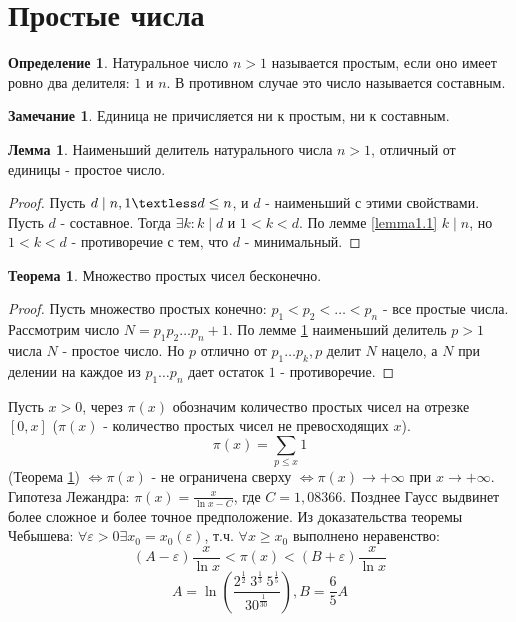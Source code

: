 \documentclass[a4paper, 12pt]{article}
\renewcommand{\epsilon}{\varepsilon}
\newcommand{\lra}{\Leftrightarrow}
\renewcommand{\div}{\mid}
\theoremstyle{definition}
\newtheorem{definition}{Определение}[section]
\newtheorem{theorem}{Теорема}[section]
\newtheorem{lemma}{Лемма}[section]
\newtheorem*{comm}{Замечание}
\begin{document}
    \section{Простые числа}
    \begin{definition}
        Натуральное число $n>1$ называется простым, если оно имеет ровно два делителя: $1$ и $n$. В противном случае это число называется составным.
    \end{definition}
    \begin{comm}
        Единица не причисляется ни к простым, ни к составным.
    \end{comm}
    \begin{lemma} \label{lemma5.1}
        Наименьший делитель натурального числа $n>1$, отличный от единицы - простое число.
    \end{lemma} 
    \begin{proof}
        Пусть $d\div n, 1 \textless d \leq n$, и $d$ - наименьший с этими свойствами. Пусть $d$ - составное. Тогда $\exists k: k\div d$ и $1<k<d$. По лемме \ref{lemma1.1} $k\div n$, но $1<k<d$ - противоречие с тем, что $d$ - минимальный.
    \end{proof} 
    \begin{theorem} \label{th5.1}
        Множество простых чисел бесконечно.
    \end{theorem}
    \begin{proof}
        Пусть множество простых конечно: $p_1<p_2<\dots<p_n$ - все простые числа. Рассмотрим число $N = p_1p_2\dots p_n+1$. По лемме \ref{lemma5.1} наименьший делитель $p>1$ числа $N$ - простое число. Но $p$ отлично от $p_1\dots p_k, p$ делит $N$ нацело, а $N$ при делении на каждое из $p_1\dots p_n$ дает остаток $1$ - противоречие.
    \end{proof} 
    Пусть $x>0$, через $\pi(x)$ обозначим количество простых чисел на отрезке $[0, x]$ ($\pi(x)$ - количество простых чисел не превосходящих $x$).
    $$\pi(x)=\sum\limits_{p\leq x}1$$
    (Теорема \ref{th5.1}) $\lra \pi(x)$ - не ограничена сверху $\lra \pi(x)\to +\infty$ при $x\to +\infty$.\\
    Гипотеза Лежандра: $\pi(x)=\frac{x}{\ln x-C}$, где $C=1,08366$. Позднее Гаусс выдвинет более сложное и более точное предположение.
    Из доказательства теоремы Чебышева: $\forall \epsilon >0\exists x_0=x_0(\epsilon)$, т.ч. $\forall x\geq x_0$ выполнено неравенство:
    $$(A-\epsilon)\frac{x}{\ln x}<\pi(x)<(B+\epsilon)\frac{x}{\ln x}$$
    $$A=\ln (\frac{2^{\frac{1}{2}} \ 3^{\frac{1}{3}} \ 5^{\frac{1}{5}}}{30^{\frac{1}{30}}}), B=\frac{6}{5}A$$
\end{document}
